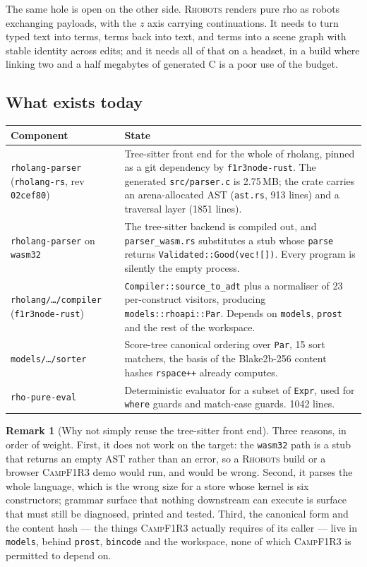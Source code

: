 \documentclass[11pt,a4paper]{article}
\newcommand{\code}[1]{\texttt{#1}}
\newcommand{\Camp}{\textsc{CampF1R3}}
\newcommand{\Rhobots}{\textsc{Rhobots}}
\theoremstyle{definition}
\newtheorem{remark}[definition]{Remark}
\theoremstyle{plain}
\begin{document}
The same hole is open on the other side. \Rhobots{} renders pure rho as robots
exchanging payloads, with the $z$ axis carrying continuations. It needs to turn
typed text into terms, terms back into text, and terms into a scene graph with
stable identity across edits; and it needs all of that on a headset, in a build
where linking two and a half megabytes of generated C is a poor use of the
budget.

\subsection{What exists today}

\begin{center}
\begin{tabularx}{\linewidth}{@{}l>{\raggedright\arraybackslash}X@{}}
\toprule
Component & State\\
\midrule
\code{rholang-parser} (\code{rholang-rs}, rev \code{02cef80}) &
Tree-sitter front end for the whole of rholang, pinned as a git dependency by
\code{f1r3node-rust}. The generated \code{src/parser.c} is 2.75\,MB; the crate
carries an arena-allocated AST (\code{ast.rs}, 913 lines) and a traversal layer
(1851 lines).\\
\code{rholang-parser} on \code{wasm32} &
The tree-sitter backend is compiled out, and \code{parser\_wasm.rs} substitutes a
stub whose \code{parse} returns \code{Validated::Good(vec![])}. Every program is
silently the empty process.\\
\code{rholang/\dots/compiler} (\code{f1r3node-rust}) &
\code{Compiler::source\_to\_adt} plus a normaliser of 23 per-construct visitors,
producing \code{models::rhoapi::Par}. Depends on \code{models}, \code{prost} and
the rest of the workspace.\\
\code{models/\dots/sorter} &
Score-tree canonical ordering over \code{Par}, 15 sort matchers, the basis of the
Blake2b-256 content hashes \code{rspace++} already computes.\\
\code{rho-pure-eval} &
Deterministic evaluator for a subset of \code{Expr}, used for \code{where} guards
and match-case guards. 1042 lines.\\
\bottomrule
\end{tabularx}
\end{center}

\begin{remark}[Why not simply reuse the tree-sitter front end]
Three reasons, in order of weight. First, it does not work on the target: the
\code{wasm32} path is a stub that returns an empty AST rather than an error, so a
\Rhobots{} build or a browser \Camp{} demo would run, and would be wrong.
Second, it parses the whole language, which is the wrong size for a store whose
kernel is six constructors; grammar surface that nothing downstream can execute
is surface that must still be diagnosed, printed and tested. Third, the
canonical form and the content hash --- the things \Camp{} actually requires of
its caller --- live in \code{models}, behind \code{prost}, \code{bincode} and the
workspace, none of which \Camp{} is permitted to depend on.
\end{remark}
\end{document}
